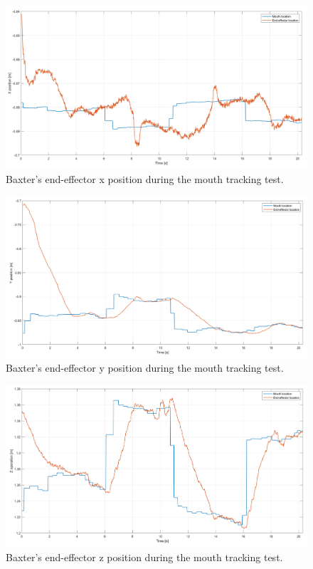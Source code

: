 \documentclass[11pt]{report} %
\begin{document}
\begin{figure}[H]
    \centering
    \includegraphics[width=1.0\linewidth]{assets/imgs/control_theory/mpc_tracking/x_pose.png}
    \caption{Baxter's end-effector x position during the mouth tracking test.} 
    \label{fig_baxter_x_pose_mpc_tracking_experiments}
\end{figure}

\begin{figure}[H]
    \centering
    \includegraphics[width=1.0\linewidth]{assets/imgs/control_theory/mpc_tracking/y_pose.png}
    \caption{Baxter's end-effector y position during the mouth tracking test.} 
    \label{fig_baxter_y_pose_mpc_tracking_experiments}
\end{figure}

\begin{figure}[H]
    \centering
    \includegraphics[width=1.0\linewidth]{assets/imgs/control_theory/mpc_tracking/z_pose.png}
    \caption{Baxter's end-effector z position during the mouth tracking test.} 
    \label{fig_baxter_z_pose_mpc_tracking_experiments}
\end{figure}
\end{document}
